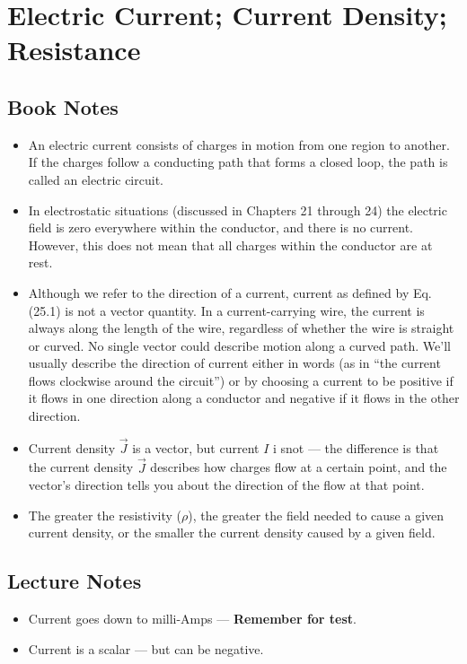 \documentclass[11pt]{article}
\newcommand{\chapterTitle}{Electric Current; Current Density; Resistance}
\begin{document}
\section{\chapterTitle}

\subsection{Book Notes}
\begin{itemize}
    \item An electric current consists of charges in motion from one region to another. If the charges follow a conducting path that forms a closed loop, the path is called an electric circuit.
    \item In electrostatic situations (discussed in Chapters 21 through 24) the electric field is zero everywhere within the conductor, and there is no current. However, this does not mean that all charges within the conductor are at rest.
    \item Although we refer to the direction of a current, current as defined by Eq. (25.1) is not a vector quantity. In a current-carrying wire, the current is always along the length of the wire, regardless of whether the wire is straight or curved. No single vector could describe motion along a curved path. We'll usually describe the direction of current either in words (as in “the current flows clockwise around the circuit”) or by choosing a current to be positive if it flows in one direction along a conductor and negative if it flows in the other direction.
    \item Current density $\vec{J}$ is a vector, but current $I$ i snot --- the difference is that the current density $\vec{J}$ describes how charges flow at a certain point, and the vector's direction tells you about the direction of the flow at that point.
    \item The greater the resistivity ($\rho$), the greater the field needed to cause a given current density, or the smaller the current density caused by a given field.

\end{itemize}

\subsection{Lecture Notes}
\begin{itemize}
    \item Current goes down to milli-Amps --- \textbf{Remember for test}.
    \item Current is a scalar --- but can be negative.
\end{itemize}
\end{document}
